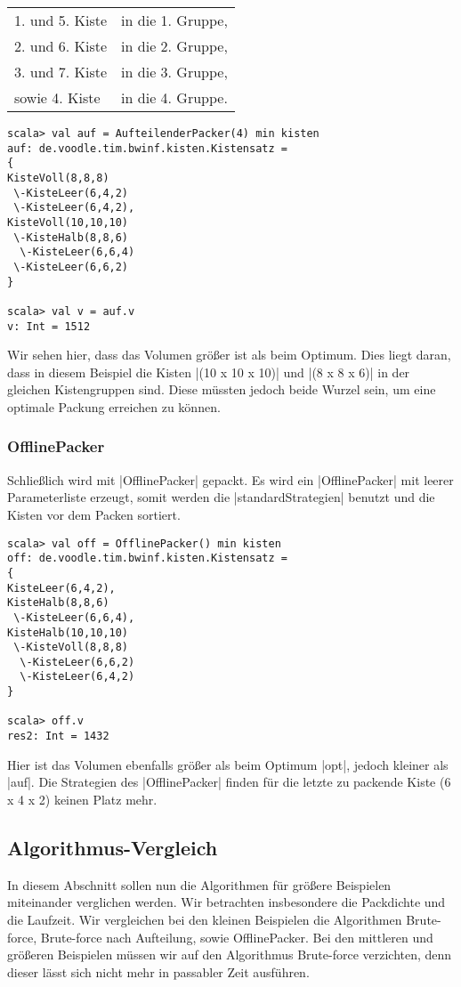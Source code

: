 \begin{tabular}{ll}
 1. und 5. Kiste & in die 1. Gruppe, \\
 2. und 6. Kiste & in die 2. Gruppe, \\
 3. und 7. Kiste & in die 3. Gruppe, \\
  sowie 4. Kiste & in die 4. Gruppe. \\
\end{tabular}

\begin{lstlisting}
scala> val auf = AufteilenderPacker(4) min kisten
auf: de.voodle.tim.bwinf.kisten.Kistensatz = 
{
KisteVoll(8,8,8)
 \-KisteLeer(6,4,2)
 \-KisteLeer(6,4,2),
KisteVoll(10,10,10)
 \-KisteHalb(8,8,6)
  \-KisteLeer(6,6,4)
 \-KisteLeer(6,6,2)
}

scala> val v = auf.v
v: Int = 1512
\end{lstlisting}
 Wir sehen hier, dass das Volumen größer ist als beim Optimum.
 Dies liegt daran, dass in diesem Beispiel die Kisten |(10 x 10 x 10)| und |(8 x 8 x 6)| in der gleichen Kistengruppen sind.
 Diese müssten jedoch beide Wurzel sein, um eine optimale Packung erreichen zu können.

\clearpage
\subsubsection*{OfflinePacker}
 Schließlich wird mit |OfflinePacker| gepackt.
 Es wird ein |OfflinePacker| mit leerer Parameterliste erzeugt, somit werden die |standardStrategien| benutzt und die Kisten vor dem Packen sortiert.
\begin{lstlisting}
scala> val off = OfflinePacker() min kisten
off: de.voodle.tim.bwinf.kisten.Kistensatz = 
{
KisteLeer(6,4,2),
KisteHalb(8,8,6)
 \-KisteLeer(6,6,4),
KisteHalb(10,10,10)
 \-KisteVoll(8,8,8)
  \-KisteLeer(6,6,2)
  \-KisteLeer(6,4,2)
}

scala> off.v
res2: Int = 1432

\end{lstlisting}
 Hier ist das Volumen ebenfalls größer als beim Optimum |opt|, jedoch kleiner als |auf|.
 Die Strategien des |OfflinePacker| finden für die letzte zu packende Kiste (6 x 4 x 2) keinen Platz mehr.

\clearpage
\subsection{Algorithmus-Vergleich}
\label{algcont}
 In diesem Abschnitt sollen nun die Algorithmen für größere Beispielen miteinander verglichen werden.
 Wir betrachten insbesondere die Packdichte und die Laufzeit.
 Wir vergleichen bei den kleinen Beispielen die Algorithmen Brute-force, Brute-force nach Aufteilung, sowie OfflinePacker.
 Bei den mittleren und größeren Beispielen müssen wir auf den Algorithmus Brute-force verzichten, denn dieser lässt sich nicht mehr in passabler Zeit ausführen.
